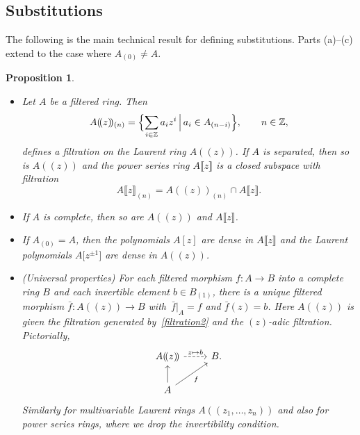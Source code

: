 \documentclass[10pt,a4paper]{amsart}
\numberwithin{equation}{section}
\newtheorem{Proposition}[Theorem]{Proposition}
\theoremstyle{definition}
\def\lb{\llbracket}
\def\rb{\rrbracket}
\begin{document}
\subsection{Substitutions}\label{s34}

The following is the main technical result for defining substitutions. Parts (a)--(c) extend \cite[Chapter~III, Section~2.6]{Bour} to the case where $A_{(0)}\neq A$.

\begin{Proposition}\quad
\begin{itemize}\itemsep=0pt
\item[$(a)$]
 Let $A$ be a filtered ring. Then
 \begin{equation}
 \label{filtration2}
 A(\!( z)\!)_{(n)}=\Bigl\{\sum_{i\in\mathbb{Z}} a_iz^i \,\Big|\, a_i\in A_{(n-i)}\Bigr\},\qquad n\in\mathbb{Z},
 \end{equation}
 defines a filtration on the Laurent ring $A(\!( z)\!)$. If $A$ is separated, then so is $A(\!( z)\!)$ and the power series ring $A\lb z\rb$ is a closed subspace with filtration
 \begin{equation}
 \label{filtration3}
 A\lb z\rb_{(n)}=A(\!( z)\!)_{(n)}\cap A\lb z\rb.
 \end{equation}
\item[$(2)$]
 If $A$ is complete, then so are $A(\!( z)\!)$ and $A\lb z\rb$.
\item[$(3)$]
 If $A_{(0)}=A$, then the polynomials $A[z]$ are dense in $A\lb z\rb$ and the Laurent polynomials $A\big[z^{\pm1}\big]$ are dense in $A(\!( z)\!)$.
\item[$(4)$]
\textup(Universal properties\textup) For each filtered morphism $f\colon A\to B$ into a complete ring $B$ and each invertible element $b\in B_{(1)}$, there is a unique filtered morphism $\bar{f}\colon A(\!( z)\!)\to B$ with~${\bar{f}|_{A}=f}$ and $\bar{f}(z)=b$. Here $A(\!( z)\!)$ is given the filtration generated by~\eqref{filtration2} and the $(z)$-adic filtration.
Pictorially,
 \begin{equation}
 \label{EvalCompletionLocalize}
 \begin{tikzcd}
 A(\!( z)\!)\arrow[r,dashed,"{z\mapsto b}"]& B.\\
 A\uar\arrow[ru,"f"']
 \end{tikzcd}
 \end{equation}
 Similarly for multivariable Laurent rings $A(\!( z_1,\dots, z_n)\!)$ and also for power series rings, where we drop the invertibility condition.
\end{itemize}
\end{Proposition}
\end{document}

